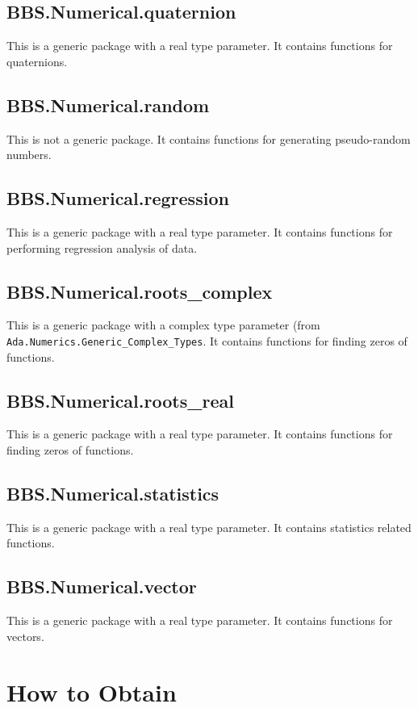 \documentclass[10pt, openany]{book}
\newcommand{\package}[1]{\texttt{#1}}
\begin{document}
\section{BBS.Numerical.quaternion}
This is a generic package with a real type parameter.  It contains functions for quaternions.

\section{BBS.Numerical.random}
This is not a generic package.  It contains functions for generating pseudo-random numbers.

\section{BBS.Numerical.regression}
This is a generic package with a real type parameter.  It contains functions for performing regression analysis of data.

\section{BBS.Numerical.roots\_complex}
This is a generic package with a complex type parameter (from \package{Ada.Numerics.Generic\_Complex\_Types}.  It contains functions for finding zeros of functions.

\section{BBS.Numerical.roots\_real}
This is a generic package with a real type parameter.  It contains functions for finding zeros of functions.

\section{BBS.Numerical.statistics}
This is a generic package with a real type parameter.  It contains statistics related functions.

\section{BBS.Numerical.vector}
This is a generic package with a real type parameter.  It contains functions for vectors.

\chapter{How to Obtain}
\end{document}

